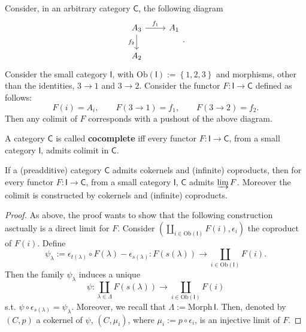 \begin{ex}
	Consider, in an arbitrary category $\mathsf{C}$, the following diagram
	\begin{equation}
	\begin{tikzcd}
		A_3 \arrow[r, "f_1", rightarrow] \arrow[d, "f_2"', rightarrow] &
		A_1\\
		A_2
	\end{tikzcd}
	.\end{equation} 
	Consider the small category $\mathsf{I}$, with $\mathrm{Ob} \left(\mathsf{I}\right) := \left\{ 1, 2, 3 \right\}$ and morphisms, other than the identities, $3 \to 1$ and $3 \to 2$.
	Consider the functor $F: \mathsf{I} \to \mathsf{C}$ defined as follows:
	\begin{equation}
		F(i) = A_i, \qquad F( 3 \to 1 ) = f_1, \qquad
		F( 3 \to 2 ) = f_2
	.\end{equation} 
	Then any colimit of $F$ corresponds with a pushout of the above diagram.
\end{ex} 

\begin{defn}
	A category $\mathsf{C}$ is called \textbf{cocomplete} iff every functor $F: \mathsf{I} \to \mathsf{C}$, from a small category $\mathsf{I}$, admits colimit in $\mathsf{C}$.
\end{defn}

\begin{prop}\label{prop:ColimConstr}
	If a (preadditive) category $\mathsf{C}$ admits cokernels and (infinite) coproducts, then
	for every functor $F: \mathsf{I} \to \mathsf{C}$, from a small category $\mathsf{I}$, $\mathsf{C}$ admits $\varinjlim F$.
	Moreover the colimit is constructed by cokernels and (infinite) coproducts.
\end{prop} 
\begin{proof}
	As above, the proof wants to show that the following construction asctually is a direct limit for $F$.
	Consider $\left(\coprod_{i \in \mathrm{Ob} \left(\mathsf{I}\right)} F(i), \epsilon_i\right)$ the coproduct of $F(i)$.
	Define
	\begin{equation}
		\psi_\lambda := \epsilon_{t(\lambda)} \circ F(\lambda) - \epsilon_{s(\lambda)}:
		F \left( s(\lambda)  \right) \to \coprod_{i \in \mathrm{Ob} \left(\mathsf{I}\right)} F(i)
	.\end{equation} 
	Then the family $\psi_\lambda$ induces a unique 
	\begin{equation}
		\psi: \coprod_{\lambda \in \Lambda} F \left( s(\lambda) \right) \to \coprod_{i \in \mathrm{Ob} \left(\mathsf{I}\right)} F(i)
	\end{equation} 
	s.t. $\psi \circ \epsilon_{s(\lambda)} = \psi_\lambda$.
	Moreover, we recall that $\Lambda := \mathrm{Morph}\, \mathsf{I}$.
	Then, denoted by $\left(C, p\right)$ a cokernel of $\psi$, $\left(C, \mu_i\right)$, where $\mu_i := p \circ\epsilon_i$, is an injective limit of $F$.
\end{proof}

